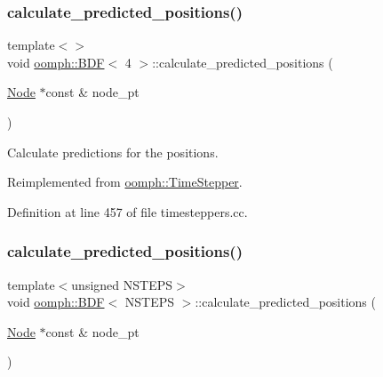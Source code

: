 \mbox{\label{classoomph_1_1BDF_a86f7aaacfb854380e3f2e6b36c6f0476}} 
\subsubsection{\texorpdfstring{calculate\+\_\+predicted\+\_\+positions()}{calculate\_predicted\_positions()}\hspace{0.1cm}{\footnotesize\ttfamily [3/4]}}
{\footnotesize\ttfamily template$<$$>$ \\
void \hyperlink{classoomph_1_1BDF}{oomph\+::\+B\+DF}$<$ 4 $>$\+::calculate\+\_\+predicted\+\_\+positions (\begin{DoxyParamCaption}\item[{\hyperlink{classoomph_1_1Node}{Node} $\ast$const \&}]{node\+\_\+pt }\end{DoxyParamCaption})\hspace{0.3cm}{\ttfamily [virtual]}}



Calculate predictions for the positions. 



Reimplemented from \hyperlink{classoomph_1_1TimeStepper_a2e7fafceb9330ac971078cf9dc248701}{oomph\+::\+Time\+Stepper}.



Definition at line 457 of file timesteppers.\+cc.

\mbox{\label{classoomph_1_1BDF_a24a8bcf4fffc8cd4514ef36fc2c997f8}} 
\subsubsection{\texorpdfstring{calculate\+\_\+predicted\+\_\+positions()}{calculate\_predicted\_positions()}\hspace{0.1cm}{\footnotesize\ttfamily [4/4]}}
{\footnotesize\ttfamily template$<$unsigned N\+S\+T\+E\+PS$>$ \\
void \hyperlink{classoomph_1_1BDF}{oomph\+::\+B\+DF}$<$ N\+S\+T\+E\+PS $>$\+::calculate\+\_\+predicted\+\_\+positions (\begin{DoxyParamCaption}\item[{\hyperlink{classoomph_1_1Node}{Node} $\ast$const \&}]{node\+\_\+pt }\end{DoxyParamCaption})\hspace{0.3cm}{\ttfamily [virtual]}}



